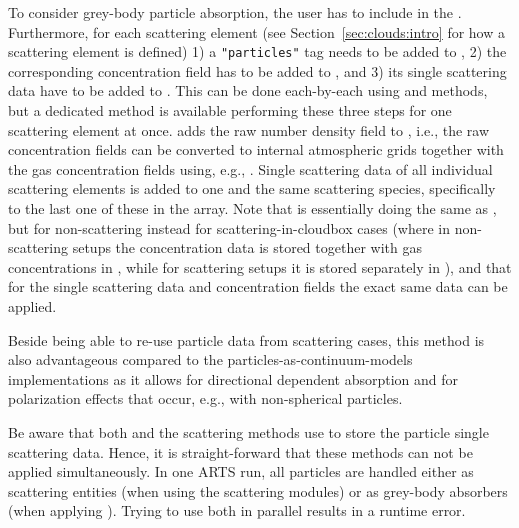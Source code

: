 To consider grey-body particle absorption, the user has to include
 in the
. Furthermore, for each scattering element
(see Section~\ref{sec:clouds:intro} for how a scattering element is defined) 1) a
\verb|"particles"| tag needs to be added to , 2) the
corresponding concentration field has to be added to ,
and 3) its single scattering data have to be added to
. This can be done each-by-each using
 and  methods, but a dedicated method
 is available performing these three
steps for one scattering element at once. 
adds the raw number density field to , i.e., the raw
concentration fields can be converted to internal atmospheric grids together
with the gas concentration fields using, e.g., .
Single scattering data of all individual scattering elements is added to one and
the same scattering species, specifically to the last one of these in the
 array.
Note that  is essentially doing the same
as , but for non-scattering instead for
scattering-in-cloudbox cases (where in non-scattering setups the concentration
data is stored together with gas concentrations in ,
while for scattering setups it is stored separately in
), and that for the single scattering data and
concentration fields the exact same data can be applied.

Beside being able to re-use particle data from scattering cases, this method is
also advantageous compared to the particles-as-continuum-models implementations
as it allows for directional dependent absorption and for polarization effects
that occur, e.g., with non-spherical particles.

Be aware that both  and the scattering methods
use  to store the particle single scattering data.
Hence, it is straight-forward that these methods can not be applied
simultaneously. In one ARTS run, all particles are handled either as scattering
entities (when using the scattering modules) or as grey-body absorbers (when
applying ). Trying to use both in
parallel results in a runtime error.

